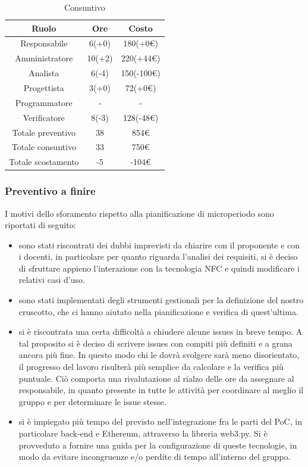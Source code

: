 \begin{table}[H]
	\centering
	\renewcommand{\arraystretch}{1.5}
	\begin{tabular}{|c|c|c|}
		\hline
		\rowcolor{lighter-grayer}
		Ruolo & Ore & Costo \\ \hline
		Responsabile & 6(+0) & 180(+0\euro) \\ \hline
		Amministratore & 10(+2) & 220(+44\euro) \\ \hline
		Analista & 6(-4) & 150(-100\euro) \\ \hline
		Progettista & 3(+0) & 72(+0\euro) \\ \hline
		Programmatore & - & - \\ \hline
		Verificatore & 8(-3) & 128(-48\euro) \\ \hline
		Totale preventivo & 38 & 854\euro \\ \hline
		Totale consuntivo & 33 & 750\euro \\ \hline
		Totale scostamento & -5 & -104\euro \\ \hline
	\end{tabular}
	\caption{ Consuntivo\\}
\end{table}

\subsubsection{Preventivo a finire}

I motivi dello sforamento rispetto alla pianificazione di microperiodo sono riportati di seguito:
\begin{itemize}
	\item sono stati riscontrati dei dubbi imprevisti da chiarire con il proponente e con i docenti, in particolare 
	per quanto riguarda l'analisi dei requisiti, si è deciso di sfruttare appieno l'interazione con la tecnologia NFC e
	quindi modificare i relativi casi d'uso.
	\item sono stati implementati degli strumenti gestionali per la definizione del nostro cruscotto, che ci hanno aiutato nella pianificazione 
	e verifica di quest'ultima. 
	\item si è riscontrata una certa difficoltà a chiudere alcune issues in breve tempo. 
	A tal proposito si è deciso di scrivere issues con compiti più definiti e
	a grana ancora più fine. In questo modo 
	chi le dovrà svolgere sarà meno disorientato, il progresso del lavoro risulterà più semplice da calcolare
	e la verifica più puntuale. Ciò comporta una rivalutazione al rialzo delle ore da assegnare al responsabile, in quanto
	presente in tutte le attività per coordinare al meglio il gruppo e per determinare le issue stesse.
	\item si è impiegato più tempo del previsto nell'integrazione fra le parti del PoC, in particolare back-end e Ethereum, attraverso la libreria web3.py. Si è provveduto a fornire una guida per la configurazione di queste tecnologie, in modo da evitare incongruenze e/o perdite di tempo all'interno del gruppo.
\end{itemize}

